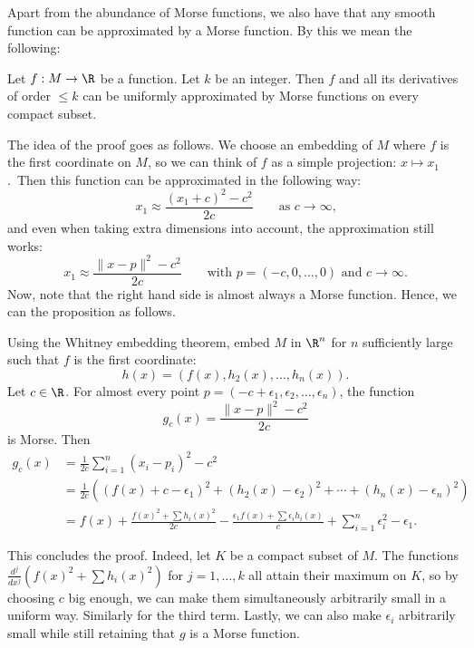 Apart from the abundance of Morse functions, we also have that any smooth function can be approximated by a Morse function. By this we mean the following:
\begin{prop}
    Let $f: M \to  \R$ be a function.
    Let $k$ be an integer.
    Then $f$ and all its derivatives of order $\le k$ can be uniformly
    approximated by Morse functions on every compact subset.
\end{prop}

The idea of the proof goes as follows.
We choose an embedding of $M$ where $f$ is the first coordinate on $M$, so we can think of $f$ as a simple projection: $x \mapsto x_1$.\sidenotemark\ Then this function can be approximated in the following way:
\[
    x_1 \approx \frac{(x_1+c)^2 - c^2}{2c} \qquad \text{as $c \to  \infty$,}
\]
and even when taking extra dimensions into account, the approximation still works:
\[
    x_1 \approx \frac{\|x - p\|^2 - c^2}{2c} \qquad \text{with $p = (-c, 0, \ldots, 0)$ and $c\to  \infty$}
.\] 
Now, note that the right hand side is almost always a Morse function.  Hence, we can the proposition as follows.

\begin{myproof}
    Using the Whitney embedding theorem, embed $M$ in $\R^{n}$ for $n$ sufficiently large such that $f$ is the first coordinate:
    \[
        h(x) = (f(x), h_2(x), \ldots, h_n(x))
    .\] 
    Let $c \in \R$. For almost every point $p = (-c + \epsilon_1, \epsilon_2, \ldots, \epsilon_n)$, the function
    \[
        g_c(x) = \frac{\|x - p\|^2 - c^2}{2c} 
    \] 
    is Morse.
    Then
    \begin{align*}
        g_c(x) &= \frac{1}{2c}  \sum_{i=1}^{n} (x_i - p_i)^2 - c^2\\
             &= \frac{1}{2c} \left((f(x) + c - \epsilon_1 )^2 + (h_2(x) - \epsilon_2)^2 + \cdots + (h_n(x) - \epsilon_n)^2\right)\\
             &= f(x) +  \frac{f(x)^2 + \sum h_i(x)^2}{2c} - \frac{\epsilon_1 f(x)  + \sum \epsilon_i h_i(x)}{c}  + \sum_{i=1}^{n} \epsilon_i^2 - \epsilon_1
    .\end{align*} 

    This concludes the proof.
    Indeed, let $K$ be a compact subset of $M$.
    The functions $\frac{d^{j}}{dx^{j}} (f(x)^2 + \sum h_i(x)^2)$ for $j = 1, \ldots,k$ all attain their maximum on $K$, so by choosing $c$ big enough, we can make them simultaneously arbitrarily small in a uniform way. Similarly for the third term.
    Lastly, we can also make $\epsilon_i$ arbitrarily small while still retaining that $g$ is a Morse function.
\end{myproof}

